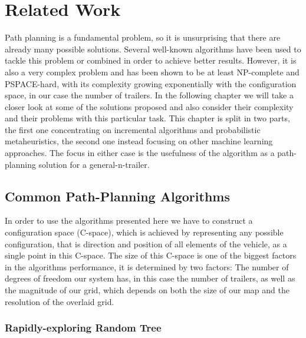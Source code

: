 \chapter{Related Work}
\label{cha:related_work}

Path planning is a fundamental problem, so it is unsurprising that there are already many possible solutions. Several well-known algorithms have been used to tackle this problem or combined in order to achieve better results. However, it is also a very complex problem and has been shown to be at least NP-complete and PSPACE-hard, with its complexity growing exponentially with the configuration space, in our case the number of trailers. \cite{1} In the following chapter we will take a closer look at some of the solutions proposed and also consider their complexity and their problems with this particular task. This chapter is split in two parts, the first one concentrating on incremental algorithms and probabilistic metaheuristics, the second one instead focusing on other machine learning approaches. The focus in either case is the usefulness of the algorithm as a path-planning solution for a general-n-trailer. \pagebreak[4]

\section{Common Path-Planning Algorithms}
\label{sec:common_pathplanning}

In order to use the algorithms presented here we have to construct a configuration space (C-space), which is achieved by representing any possible configuration, that is direction and position of all elements of the vehicle, as a single point in this C-space. The size of this C-space is one of the biggest factors in the algorithms performance, it is determined by two factors: The number of degrees of freedom our system has, in this case the number of trailers, as well as the magnitude of our grid, which depends on both the size of our map and the resolution of the overlaid grid.

\subsection{Rapidly-exploring Random Tree}
\label{sec:rrt}

